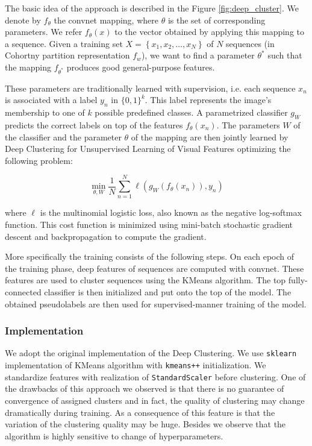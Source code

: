 \documentclass[10pt]{article}
\begin{document}
The basic idea of the approach is described in the Figure \ref{fig:deep_cluster}. We denote by $f_{\theta}$ the convnet mapping, where $\theta$ is the set of corresponding parameters. We refer $f_{\theta}(x)$ to the vector obtained by applying this mapping to a sequence. Given a training set $X=\left\{x_{1}, x_{2}, \ldots, x_{N}\right\}$ of $N$ sequences (in Cohortny partition representation $f_w$), we want to find a parameter $\theta^{*}$ such that the mapping $f_{\theta^{*}}$ produces good general-purpose features.

These parameters are traditionally learned with supervision, i.e. each sequence $x_{n}$ is associated with a label $y_{n}$ in $\{0,1\}^{k} .$ This label represents the image's membership to one of $k$ possible predefined classes. A parametrized classifier $g_{W}$ predicts the correct labels on top of the features $f_{\theta}\left(x_{n}\right) .$ The parameters $W$ of the classifier and the parameter $\theta$ of the mapping are then jointly learned by
Deep Clustering for Unsupervised Learning of Visual Features
optimizing the following problem:

\begin{equation}
\min _{\theta, W} \frac{1}{N} \sum_{n=1}^{N} \ell\left(g_{W}\left(f_{\theta}\left(x_{n}\right)\right), y_{n}\right)
\end{equation}

where $\ell$ is the multinomial logistic loss, also known as the negative log-softmax function. This cost function is minimized using mini-batch stochastic gradient descent and backpropagation to compute the gradient.

More specifically the training consists of the following steps. On each epoch of the training phase, deep features of sequences are computed with convnet. These features are used to cluster sequences using the KMeans algorithm. The top fully-connected classifier is then initialized and put onto the top of the model. The obtained pseudolabels are then used for supervised-manner training of the model.  


\subsubsection{Implementation}
We adopt the original implementation of the Deep Clustering. We use \texttt{sklearn} implementation of KMeans algorithm with \texttt{kmeans++} initialization. We standardize features with  realization of \texttt{StandardScaler} before clustering. One of the drawbacks of this approach we observed is that there is no guarantee of convergence of assigned clusters and in fact, the quality of clustering may change dramatically during training. As a consequence of this feature is that the variation of the clustering quality may be huge. Besides we observe that the algorithm is highly sensitive to change of hyperparameters. 
\end{document}
